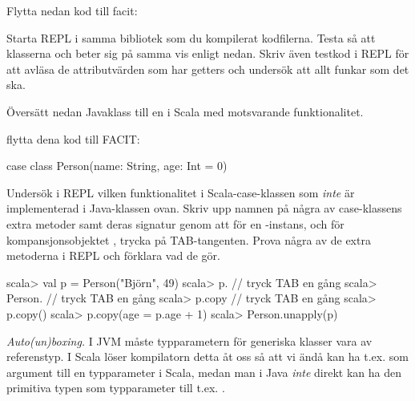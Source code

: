\TODO Flytta nedan kod till facit:


\Subtask Starta REPL i samma bibliotek som du kompilerat kodfilerna. Testa så att klasserna  och  beter sig på samma vis enligt nedan. Skriv även testkod i REPL för att avläsa de attributvärden som har getters och undersök att allt funkar som det ska.


\Subtask Översätt nedan Javaklass  till en  i Scala med  motsvarande funktionalitet.  




\TODO flytta dena kod till FACIT:
\begin{Code}
case class Person(name: String, age: Int = 0)
\end{Code}

\Subtask\Pen Undersök i REPL vilken funktionalitet i Scala-case-klassen  som \emph{inte} är implementerad i Java-klassen  ovan. Skriv upp namnen på några av case-klassens extra metoder samt deras signatur genom att för en -instans, och för kompansjonsobjektet , trycka på TAB-tangenten. Prova några av de extra metoderna i REPL och förklara vad de gör.

\begin{REPL}
scala> val p = Person("Björn", 49)
scala> p.      // tryck TAB en gång
scala> Person. // tryck TAB en gång
scala> p.copy  // tryck TAB en gång
scala> p.copy()
scala> p.copy(age = p.age + 1)
scala> Person.unapply(p)
\end{REPL}


\Task \emph{Auto(un)boxing.} I JVM måste typparametern för generiska klasser vara av referenstyp. I Scala löser kompilatorn detta åt oss så att vi ändå kan ha t.ex.  som argument till en typparameter i Scala, medan man i Java \emph{inte} direkt kan ha den primitiva typen  som typparameter till t.ex. .

